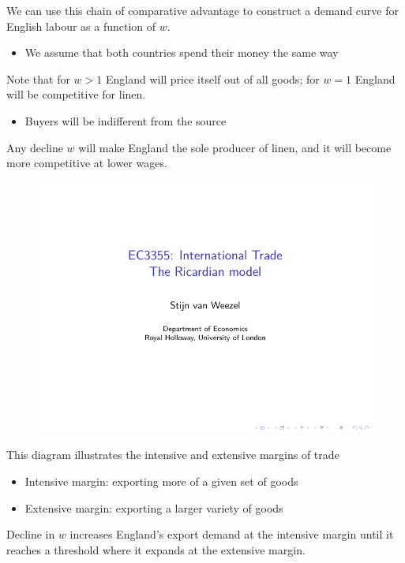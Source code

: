 \documentclass{beamer}
\begin{document}
\begin{frame}
  We can use this chain of comparative advantage to construct a demand curve for English labour as a function of $w$. 
  \begin{itemize}
    \item We assume that both countries spend their money the same way
  \end{itemize}
  \medskip
  Note that for $w>1$ England will price itself out of all goods; for $w=1$ England will be competitive for linen.
  \begin{itemize}
    \item Buyers will be indifferent from the source
  \end{itemize} 
  Any decline $w$ will make England the sole producer of linen, and it will become more competitive at lower wages.  
\end{frame}

\begin{frame}
  \begin{figure}\centering
    \includegraphics[scale=.7]{ricardo}
  \end{figure}
\end{frame}

\begin{frame}
  This diagram illustrates the intensive and extensive margins of trade
  \begin{itemize}
    \item Intensive margin: exporting more of a given set of goods
    \item Extensive margin: exporting a larger variety of goods
  \end{itemize}
  \medskip
  Decline in $w$ increases England's export demand at the intensive margin until it reaches a threshold where it expands at the extensive margin.   
\end{frame}
\end{document}
